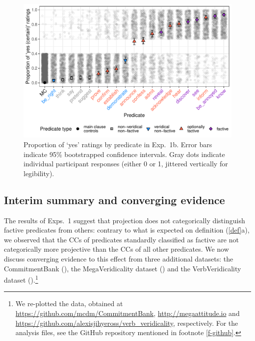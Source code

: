 \documentclass[11pt,fleqn]{article}
\newcommand{\6}{\mbox{$[\hspace*{-.6mm}[$}}
\newcommand{\9}{\mbox{$]\hspace*{-.6mm}]$}}
\begin{document}
\begin{figure}[H]

\centering
\includegraphics[width=.7\paperwidth]{../../results/8-projectivity-no-fact-binary/graphs/proportion-by-predicate-variability}
\caption{Proportion of `yes' ratings by predicate in Exp.~1b. Error bars indicate 95\% bootstrapped confidence intervals. Gray dots indicate individual participant responses (either 0 or 1, jittered vertically for legibility).}
\label{f-projectivity2}

\end{figure}

\subsection{Interim summary and converging evidence}
\label{s-converging1}

The results of Exps.~1 suggest that projection does not categorically distinguish factive predicates from others: contrary to what is expected on definition (\ref{def}a), we observed that the CCs of predicates standardly classified as factive are not categorically more projective than the CCs of all other predicates. We now discuss converging evidence to this effect from three additional datasets: the CommitmentBank (\citealt*{demarneffe-etal-sub23}), the MegaVeridicality dataset (\citealt{white-rawlins-nels2018,white-etal2018b}) and the VerbVeridicality dataset (\citealt{ross-pavlick2019}).\footnote{We re-plotted the data, obtained at \url{https://github.com/mcdm/CommitmentBank}, \url{http://megaattitude.io} and \url{https://github.com/alexisjihyeross/verb_veridicality}, respectively. For the analysis files, see the GitHub repository mentioned in footnote \ref{f-github}.}
\end{document}
